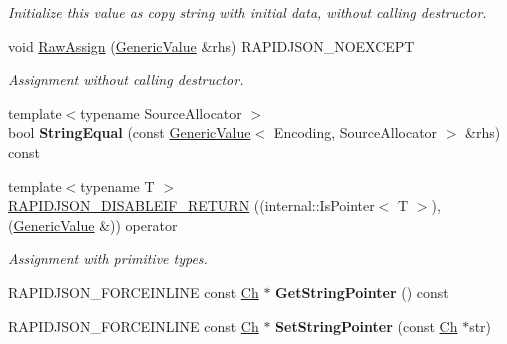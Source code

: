 \begin{DoxyCompactItemize}
\begin{DoxyCompactList}\small\item\em Initialize this value as copy string with initial data, without calling destructor. \end{DoxyCompactList}\item 
void \hyperlink{class_generic_value_abb8ea2dfbe74ff4ee7dac6be31317f81}{Raw\+Assign} (\hyperlink{class_generic_value}{Generic\+Value} \&rhs) R\+A\+P\+I\+D\+J\+S\+O\+N\+\_\+\+N\+O\+E\+X\+C\+E\+PT\hypertarget{class_generic_value_abb8ea2dfbe74ff4ee7dac6be31317f81}{}\label{class_generic_value_abb8ea2dfbe74ff4ee7dac6be31317f81}

\begin{DoxyCompactList}\small\item\em Assignment without calling destructor. \end{DoxyCompactList}\item 
{\footnotesize template$<$typename Source\+Allocator $>$ }\\bool {\bfseries String\+Equal} (const \hyperlink{class_generic_value}{Generic\+Value}$<$ Encoding, Source\+Allocator $>$ \&rhs) const \hypertarget{class_generic_value_a5ff908402687e14f5f14552ec58113a4}{}\label{class_generic_value_a5ff908402687e14f5f14552ec58113a4}

\item 
{\footnotesize template$<$typename T $>$ }\\\hyperlink{class_generic_value_a4a4418a93777942e1fb7ea71f8aaf680}{R\+A\+P\+I\+D\+J\+S\+O\+N\+\_\+\+D\+I\+S\+A\+B\+L\+E\+I\+F\+\_\+\+R\+E\+T\+U\+RN} ((internal\+::\+Is\+Pointer$<$ T $>$),(\hyperlink{class_generic_value}{Generic\+Value} \&)) operator
\begin{DoxyCompactList}\small\item\em Assignment with primitive types. \end{DoxyCompactList}\item 
R\+A\+P\+I\+D\+J\+S\+O\+N\+\_\+\+F\+O\+R\+C\+E\+I\+N\+L\+I\+NE const \hyperlink{class_generic_value_ade0e0ce64ccd5d852da57a35e720bafb}{Ch} $\ast$ {\bfseries Get\+String\+Pointer} () const \hypertarget{class_generic_value_a48a38c5d37e3f1669bb72c1617e54b8c}{}\label{class_generic_value_a48a38c5d37e3f1669bb72c1617e54b8c}

\item 
R\+A\+P\+I\+D\+J\+S\+O\+N\+\_\+\+F\+O\+R\+C\+E\+I\+N\+L\+I\+NE const \hyperlink{class_generic_value_ade0e0ce64ccd5d852da57a35e720bafb}{Ch} $\ast$ {\bfseries Set\+String\+Pointer} (const \hyperlink{class_generic_value_ade0e0ce64ccd5d852da57a35e720bafb}{Ch} $\ast$str)\hypertarget{class_generic_value_aa3d65011422b4aba50bf035b21a522e1}{}\label{class_generic_value_aa3d65011422b4aba50bf035b21a522e1}


\end{DoxyCompactItemize}
